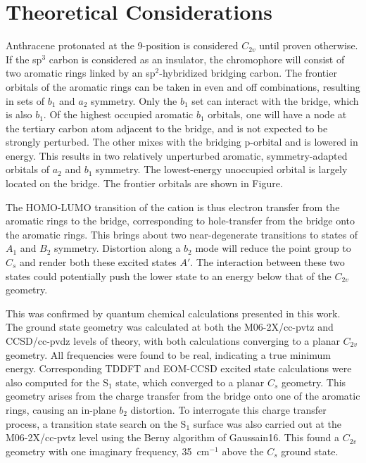 \documentclass[journal=jpcafh,manuscript=article,layout=onecolumn, 12pt]{achemso}
\begin{document}
\section{Theoretical Considerations}
Anthracene protonated at the 9-position is considered $C_{2v}$ until proven otherwise. If the sp$^3$ carbon is considered as an insulator, the chromophore will consist of two aromatic rings linked by an sp$^2$-hybridized bridging carbon. The frontier orbitals of the aromatic rings can be taken in even and off combinations, resulting in sets of $b_1$ and $a_2$ symmetry. Only the $b_1$ set can interact with the bridge, which is also $b_1$. Of the highest occupied aromatic $b_1$ orbitals, one will have a node at the tertiary carbon atom adjacent to the bridge, and is not expected to be strongly perturbed. The other mixes with the bridging p-orbital and is lowered in energy. This results in two relatively unperturbed aromatic, symmetry-adapted orbitals of $a_2$ and $b_1$ symmetry. The lowest-energy unoccupied orbital is largely located on the bridge. The frontier orbitals are shown in Figure.

The HOMO-LUMO transition of the cation is thus electron transfer from the aromatic rings to the bridge, corresponding to hole-transfer from the bridge onto the aromatic rings. This brings about two near-degenerate transitions to states of $A_1$ and $B_2$ symmetry. Distortion along a $b_2$ mode will reduce the point group to $C_s$ and render both these excited states $A'$. The interaction between these two states could potentially push the lower state to an energy below that of the $C_{2v}$ geometry.

This was confirmed by quantum chemical calculations presented in this work. The ground state geometry was calculated at both the M06-2X/cc-pvtz and CCSD/cc-pvdz levels of theory, with both calculations converging to a planar $C_{2v}$ geometry. All frequencies were found to be real, indicating a true minimum energy. Corresponding TDDFT and EOM-CCSD excited state calculations were also computed for the S$_1$ state, which converged to a planar $C_s$ geometry. This geometry arises from the charge transfer from the bridge onto one of the aromatic rings, causing an in-plane $b_2$ distortion. To interrogate this charge transfer process, a transition state search on the S$_1$ surface was also carried out at the M06-2X/cc-pvtz level using the Berny algorithm of Gaussain16. This found a $C_{2v}$ geometry with one imaginary frequency, 35~cm$^{-1}$ above the $C_s$ ground state.
\end{document}

